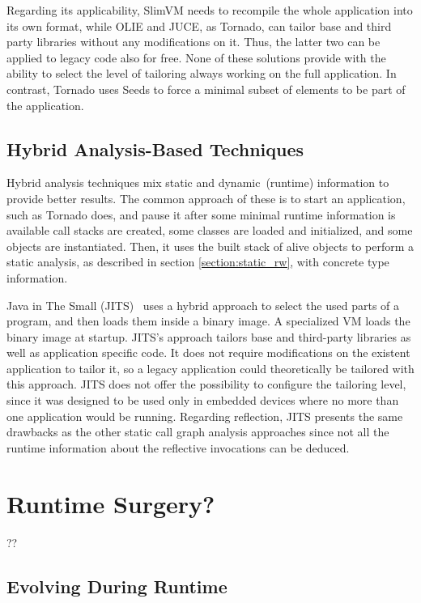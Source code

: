 Regarding its applicability, SlimVM needs to recompile the whole application into its own format, while OLIE and JUCE, as Tornado, can tailor base and third party libraries without any modifications on it. Thus, the latter two can be applied to legacy code also for free. None of these solutions provide with the ability to select the level of tailoring always working on the full application. In contrast, Tornado uses Seeds to force a minimal subset of elements to be part of the application.


\subsection{Hybrid Analysis-Based Techniques}\label{section:hybrid_rw}

Hybrid analysis techniques mix static and dynamic~(\ie runtime) information to provide better results. The common approach of these is to start an application, such as Tornado does, and pause it after some minimal runtime information is available \ie call stacks are created, some classes are loaded and initialized, and some objects are instantiated. Then, it uses the built stack of alive objects to perform a static analysis, as described in section \ref{section:static_rw}, with concrete type information.

Java in The Small (JITS)~\cite{ShortCour10a} uses a hybrid approach to select the used parts of a program, and then loads them inside a binary image. A specialized VM loads the binary image at startup. JITS's approach tailors base and third-party libraries as well as application specific code. It does not require modifications on the existent application to tailor it, so a legacy application could theoretically be tailored with this approach. JITS does not offer the possibility to configure the tailoring level, since it was designed to be used only in embedded devices where no more than one application would be running. Regarding reflection, JITS presents the same drawbacks as the other static call graph analysis approaches since not all the runtime information about the reflective invocations can be deduced.

\section{Runtime Surgery?}

??

\subsection{Evolving During Runtime}

